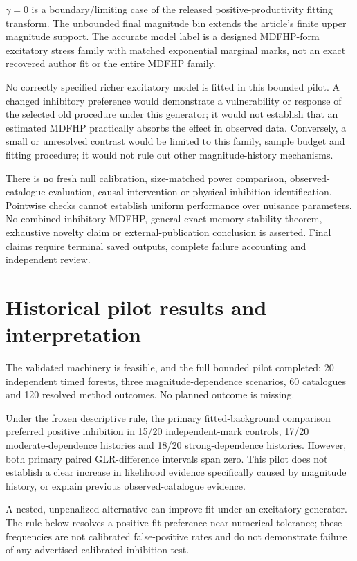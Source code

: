 $\gamma=0$ is a boundary/limiting case of the released positive-productivity fitting transform. The unbounded final magnitude bin extends the article's finite upper magnitude support. The accurate model label is a designed MDFHP-form excitatory stress family with matched exponential marginal marks, not an exact recovered author fit or the entire MDFHP family.

No correctly specified richer excitatory model is fitted in this bounded pilot. A changed inhibitory preference would demonstrate a vulnerability or response of the selected old procedure under this generator; it would not establish that an estimated MDFHP practically absorbs the effect in observed data. Conversely, a small or unresolved contrast would be limited to this family, sample budget and fitting procedure; it would not rule out other magnitude-history mechanisms.

There is no fresh null calibration, size-matched power comparison, observed-catalogue evaluation, causal intervention or physical inhibition identification. Pointwise checks cannot establish uniform performance over nuisance parameters. No combined inhibitory MDFHP, general exact-memory stability theorem, exhaustive novelty claim or external-publication conclusion is asserted. Final claims require terminal saved outputs, complete failure accounting and independent review.

\section{Historical pilot results and interpretation}

The validated machinery is feasible, and the full bounded pilot completed: 20 independent timed forests, three magnitude-dependence scenarios, 60 catalogues and 120 resolved method outcomes. No planned outcome is missing.

Under the frozen descriptive rule, the primary fitted-background comparison preferred positive inhibition in 15/20 independent-mark controls, 17/20 moderate-dependence histories and 18/20 strong-dependence histories. However, both primary paired GLR-difference intervals span zero. This pilot does not establish a clear increase in likelihood evidence specifically caused by magnitude history, or explain previous observed-catalogue evidence.

A nested, unpenalized alternative can improve fit under an excitatory generator. The rule below resolves a positive fit preference near numerical tolerance; these frequencies are not calibrated false-positive rates and do not demonstrate failure of any advertised calibrated inhibition test.

